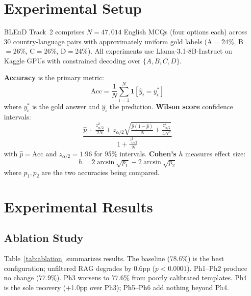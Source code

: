 \documentclass[11pt,a4paper]{article}
\begin{document}
\section{Experimental Setup}
BLEnD Track~2 comprises $N = 47{,}014$ English MCQs (four options each) across 30 country-language pairs with approximately uniform gold labels (A$=$24\%, B$=$26\%, C$=$26\%, D$=$24\%). All experiments use Llama-3.1-8B-Instruct \cite{meta2024llama} on Kaggle GPUs with constrained decoding over $\{A, B, C, D\}$.

\textbf{Accuracy} is the primary metric:
\begin{equation}
    \text{Acc} = \frac{1}{N} \sum_{i=1}^{N} \mathbf{1}[\hat{y}_i = y_i^*]
\end{equation}
where $y_i^*$ is the gold answer and $\hat{y}_i$ the prediction. \textbf{Wilson score} confidence intervals:
\begin{equation}
    \frac{\hat{p} + \frac{z_{\alpha/2}^2}{2N} \pm
    z_{\alpha/2}\sqrt{\frac{\hat{p}(1-\hat{p})}{N} + \frac{z_{\alpha/2}^2}{4N^2}}}
    {1 + \frac{z_{\alpha/2}^2}{N}}
\end{equation}
with $\hat{p} = \text{Acc}$ and $z_{\alpha/2} = 1.96$ for 95\% intervals. \textbf{Cohen's $h$} measures effect size:
\begin{equation}
    h = 2\arcsin\!\sqrt{p_1} - 2\arcsin\!\sqrt{p_2}
\end{equation}
where $p_1, p_2$ are the two accuracies being compared.

\section{Experimental Results}

\subsection{Ablation Study}
Table~\ref{tab:ablation} summarizes results. The baseline (78.6\%) is the best configuration; unfiltered RAG degrades by 0.6pp ($p < 0.0001$). Ph1--Ph2 produce no change (77.9\%). Ph3 worsens to 77.6\% from poorly calibrated templates. Ph4 is the sole recovery (+1.0pp over Ph3); Ph5--Ph6 add nothing beyond Ph4.
\end{document}

